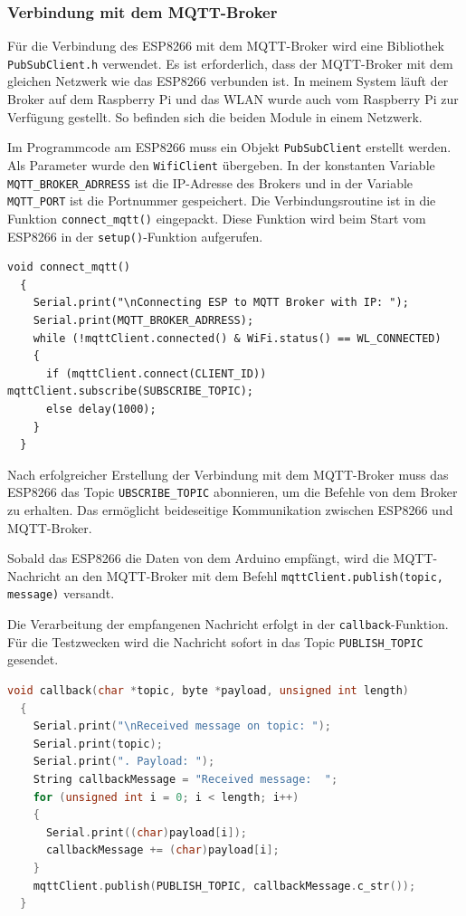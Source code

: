 \documentclass[12pt, letterpaper]{article}
\begin{document}
\subsubsection{Verbindung mit dem MQTT-Broker}
\par Für die Verbindung des ESP8266 mit dem MQTT-Broker wird eine Bibliothek \texttt{PubSubClient.h} verwendet. Es ist erforderlich, dass der MQTT-Broker mit dem gleichen Netzwerk wie das ESP8266 verbunden ist. In meinem System läuft der Broker auf dem Raspberry Pi und das WLAN wurde auch vom Raspberry Pi zur Verfügung gestellt. So befinden sich die beiden Module in einem Netzwerk. 
\par Im Programmcode am ESP8266 muss ein Objekt \texttt{PubSubClient} erstellt werden. Als Parameter wurde den \texttt{WifiClient} übergeben. In der konstanten Variable \texttt{MQTT\_BROKER\_ADRRESS} ist die IP-Adresse des Brokers und in der Variable \texttt{MQTT\_PORT} ist die Portnummer gespeichert. Die Verbindungsroutine ist in die Funktion \texttt{connect\_mqtt()} eingepackt. Diese Funktion wird beim Start vom ESP8266 in der \texttt{setup()}-Funktion aufgerufen.
\begin{Verbatim}[frame=single]
  void connect_mqtt()
  {
    Serial.print("\nConnecting ESP to MQTT Broker with IP: ");
    Serial.print(MQTT_BROKER_ADRRESS);
    while (!mqttClient.connected() & WiFi.status() == WL_CONNECTED)
    {
      if (mqttClient.connect(CLIENT_ID)) mqttClient.subscribe(SUBSCRIBE_TOPIC);
      else delay(1000);
    }
  }
\end{Verbatim}
\par Nach erfolgreicher Erstellung der Verbindung mit dem MQTT-Broker muss das ESP8266 das Topic \texttt{UBSCRIBE\_TOPIC} abonnieren, um die Befehle von dem Broker zu erhalten. Das ermöglicht beideseitige Kommunikation zwischen ESP8266 und MQTT-Broker.
\par Sobald das ESP8266 die Daten von dem Arduino empfängt, wird die MQTT-Nachricht an den MQTT-Broker mit dem Befehl \texttt{mqttClient.publish(topic, message)} versandt.
\par Die Verarbeitung der empfangenen Nachricht erfolgt in der \texttt{callback}-Funktion. Für die Testzwecken wird die Nachricht sofort in das Topic \texttt{PUBLISH\_TOPIC} gesendet.

\begin{lstlisting}[frame=none, language=c, caption={caption text},captionpos=b]
  void callback(char *topic, byte *payload, unsigned int length)
  {
    Serial.print("\nReceived message on topic: ");
    Serial.print(topic);
    Serial.print(". Payload: ");
    String callbackMessage = "Received message:  ";
    for (unsigned int i = 0; i < length; i++)
    {
      Serial.print((char)payload[i]);
      callbackMessage += (char)payload[i];
    }
    mqttClient.publish(PUBLISH_TOPIC, callbackMessage.c_str());
  }
\end{lstlisting}
\newpage

\listoffigures
\listoftables
\lstlistoflistings
\end{document}
